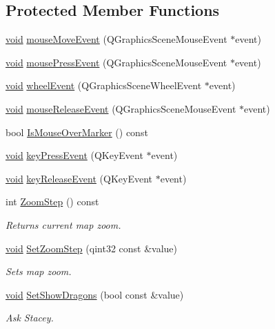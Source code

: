 \subsection*{\-Protected \-Member \-Functions}
\begin{DoxyCompactItemize}
\item 
\hyperlink{group___u_a_v_objects_plugin_ga444cf2ff3f0ecbe028adce838d373f5c}{void} \hyperlink{group___o_p_map_widget_ga60c7e55c1ee2c957be5233e999912521}{mouse\-Move\-Event} (\-Q\-Graphics\-Scene\-Mouse\-Event $\ast$event)
\item 
\hyperlink{group___u_a_v_objects_plugin_ga444cf2ff3f0ecbe028adce838d373f5c}{void} \hyperlink{group___o_p_map_widget_ga6f27143f563d9f5bb72d36e06078f488}{mouse\-Press\-Event} (\-Q\-Graphics\-Scene\-Mouse\-Event $\ast$event)
\item 
\hyperlink{group___u_a_v_objects_plugin_ga444cf2ff3f0ecbe028adce838d373f5c}{void} \hyperlink{group___o_p_map_widget_ga93a150c4f1ed84aa194b153b55bc9cd3}{wheel\-Event} (\-Q\-Graphics\-Scene\-Wheel\-Event $\ast$event)
\item 
\hyperlink{group___u_a_v_objects_plugin_ga444cf2ff3f0ecbe028adce838d373f5c}{void} \hyperlink{group___o_p_map_widget_gaba0f1f6f68f5a4765b966b704c7efddd}{mouse\-Release\-Event} (\-Q\-Graphics\-Scene\-Mouse\-Event $\ast$event)
\item 
bool \hyperlink{group___o_p_map_widget_ga974c2e697780b93234f9001d03d5e89f}{\-Is\-Mouse\-Over\-Marker} () const 
\item 
\hyperlink{group___u_a_v_objects_plugin_ga444cf2ff3f0ecbe028adce838d373f5c}{void} \hyperlink{group___o_p_map_widget_ga3c52576f9f0733ac4ea3882ce67a3ee0}{key\-Press\-Event} (\-Q\-Key\-Event $\ast$event)
\item 
\hyperlink{group___u_a_v_objects_plugin_ga444cf2ff3f0ecbe028adce838d373f5c}{void} \hyperlink{group___o_p_map_widget_ga2244e13f8bb36fe4230c1776f802e175}{key\-Release\-Event} (\-Q\-Key\-Event $\ast$event)
\item 
int \hyperlink{group___o_p_map_widget_gac33e6f99e690bfc9725bbb33b9078d91}{\-Zoom\-Step} () const 
\begin{DoxyCompactList}\small\item\em \-Returns current map zoom. \end{DoxyCompactList}\item 
\hyperlink{group___u_a_v_objects_plugin_ga444cf2ff3f0ecbe028adce838d373f5c}{void} \hyperlink{group___o_p_map_widget_ga45d9811a4fc7a2a8c6a677b4501a031d}{\-Set\-Zoom\-Step} (qint32 const \&value)
\begin{DoxyCompactList}\small\item\em \-Sets map zoom. \end{DoxyCompactList}\item 
\hyperlink{group___u_a_v_objects_plugin_ga444cf2ff3f0ecbe028adce838d373f5c}{void} \hyperlink{group___o_p_map_widget_gaf6a44ff6d44e64585620480128100737}{\-Set\-Show\-Dragons} (bool const \&value)
\begin{DoxyCompactList}\small\item\em \-Ask \-Stacey. \end{DoxyCompactList}\end{DoxyCompactItemize}
